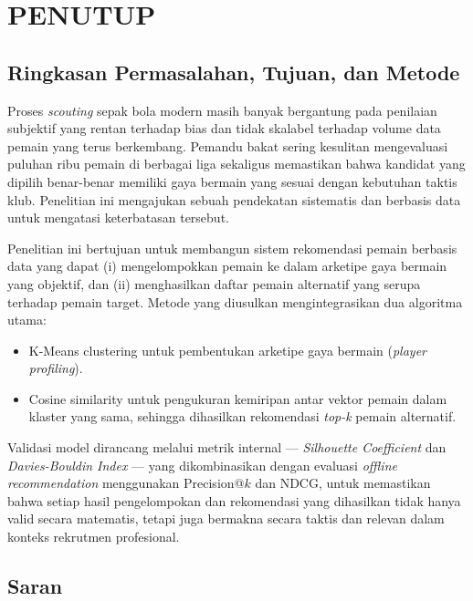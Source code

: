 \chapter{PENUTUP}
\label{bab:penutup}

\section{Ringkasan Permasalahan, Tujuan, dan Metode}
\label{sec:ringkasan-penutup}

Proses \emph{scouting} sepak bola modern masih banyak bergantung pada penilaian subjektif yang rentan terhadap bias dan tidak skalabel terhadap volume data pemain yang terus berkembang. Pemandu bakat sering kesulitan mengevaluasi puluhan ribu pemain di berbagai liga sekaligus memastikan bahwa kandidat yang dipilih benar-benar memiliki gaya bermain yang sesuai dengan kebutuhan taktis klub. Penelitian ini mengajukan sebuah pendekatan sistematis dan berbasis data untuk mengatasi keterbatasan tersebut.

Penelitian ini bertujuan untuk membangun sistem rekomendasi pemain berbasis data yang dapat (i) mengelompokkan pemain ke dalam arketipe gaya bermain yang objektif, dan (ii) menghasilkan daftar pemain alternatif yang serupa terhadap pemain target. Metode yang diusulkan mengintegrasikan dua algoritma utama:

\begin{itemize}
  \item K-Means clustering untuk pembentukan arketipe gaya bermain (\emph{player profiling}).
  \item Cosine similarity untuk pengukuran kemiripan antar vektor pemain dalam klaster yang sama, sehingga dihasilkan rekomendasi \emph{top-k} pemain alternatif.
\end{itemize}

Validasi model dirancang melalui metrik internal --- \emph{Silhouette Coefficient} dan \emph{Davies-Bouldin Index} --- yang dikombinasikan dengan evaluasi \emph{offline recommendation} menggunakan Precision@$k$ dan NDCG, untuk memastikan bahwa setiap hasil pengelompokan dan rekomendasi yang dihasilkan tidak hanya valid secara matematis, tetapi juga bermakna secara taktis dan relevan dalam konteks rekrutmen profesional.

\section{Saran}
\label{sec:saran}

